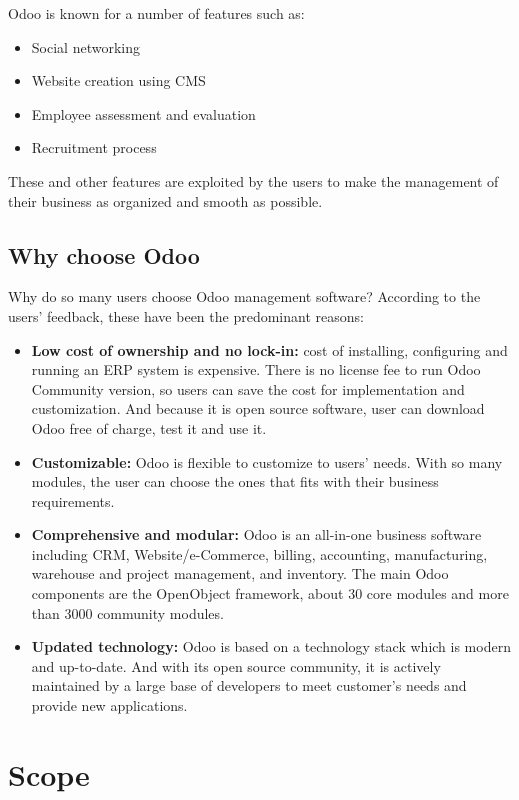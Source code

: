 Odoo is known for a number of features such as:

\begin{itemize}
	\item Social networking
	\item Website creation using CMS
	\item Employee assessment and evaluation
	\item Recruitment process
\end{itemize}

These and other features are exploited by the users to make the management of their business as
organized and smooth as possible.

\subsection{Why choose Odoo}

Why do so many users choose Odoo management software? According to the users’ feedback, these
have been the predominant reasons:

\begin{itemize}
	\item \textbf{Low cost of ownership and no lock-in:} cost of installing, configuring and running an ERP
system is expensive. There is no license fee to run Odoo Community version, so users can
save the cost for implementation and customization. And because it is open source
software, user can download Odoo free of charge, test it and use it.
	\item \textbf{Customizable:} Odoo is flexible to customize to users’ needs. With so many modules, the
user can choose the ones that fits with their business requirements.
	\item \textbf{Comprehensive and modular:} Odoo is an all-in-one business software including CRM,
Website/e-Commerce, billing, accounting, manufacturing, warehouse and project
management, and inventory. The main Odoo components are the OpenObject framework,
about 30 core modules and more than 3000 community modules.
	\item \textbf{Updated technology:} Odoo is based on a technology stack which is modern and up-to-date.
And with its open source community, it is actively maintained by a large base of developers
to meet customer’s needs and provide new applications.
\end{itemize}

\section{Scope}

